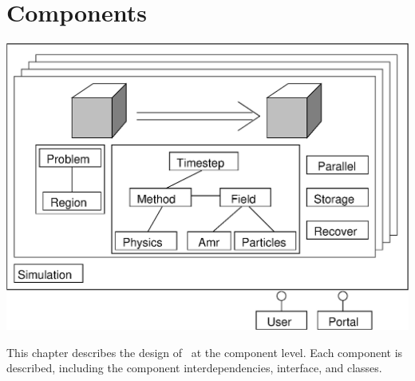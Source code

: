 \chapter{Components} \label{c:components}



\centerline{\includegraphics[totalheight=3in]{components.eps}}

   This chapter describes the design of \cello\ at the component
   level.  Each component is described, including the component
   interdependencies, interface, and classes.

